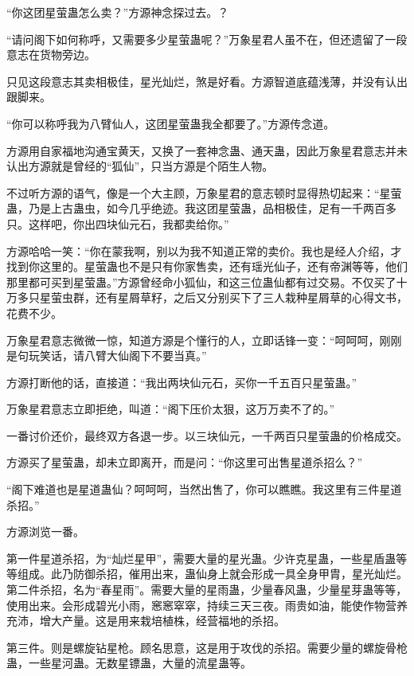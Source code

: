 
\begin{this_body}

“你这团星萤蛊怎么卖？”方源神念探过去。？

“请问阁下如何称呼，又需要多少星萤蛊呢？”万象星君人虽不在，但还遗留了一段意志在货物旁边。

只见这段意志其卖相极佳，星光灿烂，煞是好看。方源智道底蕴浅薄，并没有认出跟脚来。

“你可以称呼我为八臂仙人，这团星萤蛊我全都要了。”方源传念道。

方源用自家福地沟通宝黄天，又换了一套神念蛊、通天蛊，因此万象星君意志并未认出方源就是曾经的“狐仙”，只当方源是个陌生人物。

不过听方源的语气，像是一个大主顾，万象星君的意志顿时显得热切起来：“星萤蛊，乃是上古蛊虫，如今几乎绝迹。我这团星萤蛊，品相极佳，足有一千两百多只。这样吧，你出四块仙元石，我都卖给你。”

方源哈哈一笑：“你在蒙我啊，别以为我不知道正常的卖价。我也是经人介绍，才找到你这里的。星萤蛊也不是只有你家售卖，还有瑶光仙子，还有帝渊等等，他们那里都可买到星萤蛊。”方源曾经命小狐仙，和这三位蛊仙都有过交易。不仅买了十万多只星萤虫群，还有星屑草籽，之后又分别买下了三人栽种星屑草的心得文书，花费不少。

万象星君意志微微一惊，知道方源是个懂行的人，立即话锋一变：“呵呵呵，刚刚是句玩笑话，请八臂大仙阁下不要当真。”

方源打断他的话，直接道：“我出两块仙元石，买你一千五百只星萤蛊。”

万象星君意志立即拒绝，叫道：“阁下压价太狠，这万万卖不了的。”

一番讨价还价，最终双方各退一步。以三块仙元，一千两百只星萤蛊的价格成交。

方源买了星萤蛊，却未立即离开，而是问：“你这里可出售星道杀招么？”

“阁下难道也是星道蛊仙？呵呵呵，当然出售了，你可以瞧瞧。我这里有三件星道杀招。”

方源浏览一番。

第一件星道杀招，为“灿烂星甲”，需要大量的星光蛊。少许克星蛊，一些星盾蛊等等组成。此乃防御杀招，催用出来，蛊仙身上就会形成一具全身甲胄，星光灿烂。第二件杀招，名为“春星雨”。需要大量的星雨蛊，少量春风蛊，少量星芽蛊等等，使用出来。会形成碧光小雨，窸窸窣窣，持续三天三夜。雨贵如油，能使作物营养充沛，增大产量。这是用来栽培植株，经营福地的杀招。

第三件。则是螺旋钻星枪。顾名思意，这是用于攻伐的杀招。需要少量的螺旋骨枪蛊，一些星河蛊。无数星镖蛊，大量的流星蛊等。


\end{this_body}
